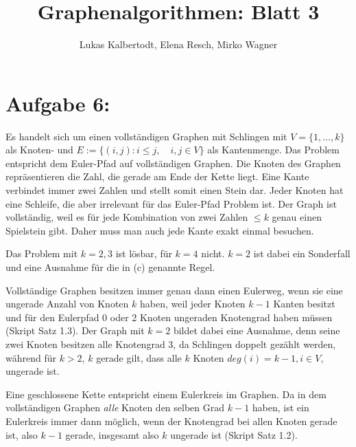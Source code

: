 \documentclass[11pt]{scrartcl} %
\title{Graphenalgorithmen: Blatt 3}
\author{Lukas Kalbertodt, Elena Resch, Mirko Wagner}
\begin{document}
\maketitle
\section*{Aufgabe 6:}
\begin{compactenum}[(a)]
\item Es handelt sich um einen vollständigen Graphen mit Schlingen mit $V = \lbrace {1, \dots ,k} \rbrace $ als Knoten- und $E:= \lbrace (i,j): i \le j, \quad i,j \in V \rbrace$ als Kantenmenge. Das Problem entspricht dem Euler-Pfad auf vollständigen Graphen.
Die Knoten des Graphen repräsentieren die Zahl, die gerade am Ende der Kette liegt. Eine Kante verbindet immer zwei Zahlen und stellt somit einen Stein dar. Jeder Knoten hat eine Schleife, die aber irrelevant für das Euler-Pfad Problem ist. Der Graph ist vollständig, weil es für jede Kombination von zwei Zahlen $\le k$ genau einen Spielstein gibt. Daher muss man auch jede Kante exakt einmal besuchen.
\item Das Problem mit $k=2,3$ ist lösbar, für $k=4$ nicht. $k=2$ ist dabei ein Sonderfall und eine Ausnahme für die in (c) genannte Regel.
\item Vollständige Graphen besitzen immer genau dann einen Eulerweg, wenn sie eine ungerade Anzahl von Knoten $k$ haben, weil jeder Knoten $k-1$ Kanten besitzt und für den Eulerpfad 0 oder 2 Knoten ungeraden Knotengrad haben müssen (Skript Satz 1.3). Der Graph mit $k=2$ bildet dabei eine Ausnahme, denn seine zwei Knoten besitzen alle Knotengrad $3$, da Schlingen doppelt gezählt werden, während für $k > 2$, $k$  gerade gilt, dass alle $k$ Knoten $deg(i) = k-1, i \in V$, ungerade ist.
\item Eine geschlossene Kette entspricht einem Eulerkreis im Graphen. Da in dem vollständigen Graphen \emph{alle} Knoten den selben Grad $k-1$ haben, ist ein Eulerkreis immer dann möglich, wenn der Knotengrad bei allen Knoten gerade ist, also $k-1$ gerade, insgesamt also $k$ ungerade ist (Skript Satz 1.2).
\end{compactenum}
\end{document}
